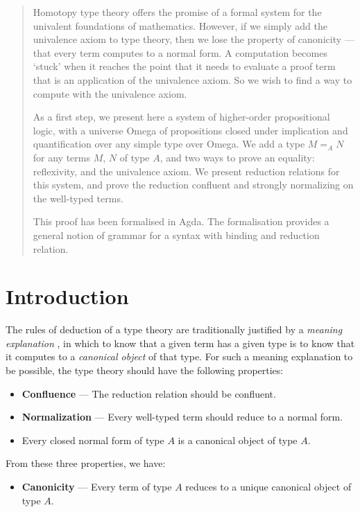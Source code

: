 \begin{abstract}
    Homotopy type theory offers the promise of a formal system for the univalent foundations of mathematics. However, if we simply add the univalence axiom to type theory, then we lose the property of canonicity --- that every term computes to a normal form. A computation becomes `stuck' when it reaches the point that it needs to evaluate a proof term that is an application of the univalence axiom. So we wish to find a way to compute with the univalence axiom.

    As a first step, we present here a system of higher-order propositional logic, with a universe Omega of propositions closed under implication and quantification over any simple type over Omega. We add a type $M =_A N$ for any terms $M$, $N$ of type $A$, and two ways to prove an equality: reflexivity, and the univalence axiom. We present reduction relations for this system, and prove the reduction confluent and strongly normalizing on the well-typed terms. 

This proof has been formalised in Agda.  The formalisation provides a general notion of grammar for a syntax with binding and reduction relation.
\end{abstract}

\section{Introduction}
\label{intro}
The rules of deduction of a type theory are traditionally justified by a \emph{meaning explanation} \cite{ML:ITT}, in which to know that a given term has a given type is to know that it computes to a \emph{canonical object} of that type.  For such a meaning explanation to be possible, the type theory should have the following properties:
\begin{itemize}
\item \textbf{Confluence} --- The reduction relation should be confluent.
\item \textbf{Normalization} --- Every well-typed term should reduce to a normal form.
\item Every closed normal form of type $A$ is a canonical object of type $A$.
\end{itemize}
From these three properties, we have:
\begin{itemize}
\item \textbf{Canonicity} --- Every term of type $A$ reduces to a unique canonical object of type $A$.
\end{itemize}

